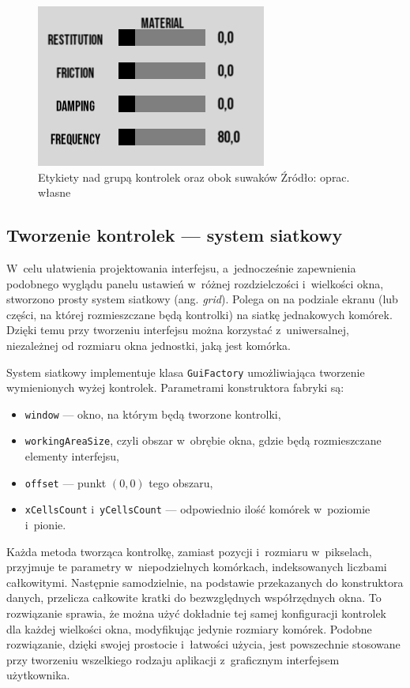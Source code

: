 \begin{figure}[h]
	\centering
	\includegraphics[width=0.3\linewidth]{images/labels}
	\caption[Etykiety nad grupą kontrolek oraz obok suwaków]{Etykiety nad grupą kontrolek oraz obok suwaków \newline Źródło: oprac. własne}
	\label{fig:label}
\end{figure}


\subsection{Tworzenie kontrolek --- system  siatkowy}
W~celu ułatwienia projektowania interfejsu, a~jednocześnie zapewnienia podobnego wyglądu panelu ustawień w~różnej rozdzielczości i~wielkości okna, stworzono prosty system siatkowy (ang. \textit{grid}). Polega on na podziale ekranu (lub części, na której rozmieszczane będą kontrolki) na siatkę jednakowych komórek. Dzięki temu przy tworzeniu interfejsu można korzystać z~uniwersalnej, niezależnej od rozmiaru okna jednostki, jaką jest komórka. 

System siatkowy implementuje klasa \verb|GuiFactory| umożliwiająca tworzenie wymienionych wyżej kontrolek. Parametrami konstruktora fabryki są:
\begin{itemize}
	\item \verb|window| --- okno, na którym będą tworzone kontrolki,
	\item \verb|workingAreaSize|, czyli obszar w~obrębie okna, gdzie będą rozmieszczane elementy interfejsu,
	\item \verb|offset| --- punkt $(0,0)$ tego obszaru,
	\item \verb|xCellsCount| i~\verb|yCellsCount| --- odpowiednio ilość komórek w~poziomie i~pionie.
\end{itemize}

Każda metoda tworząca kontrolkę, zamiast pozycji i~rozmiaru w~pikselach, przyjmuje te parametry w~niepodzielnych komórkach, indeksowanych liczbami całkowitymi. Następnie samodzielnie, na podstawie przekazanych do konstruktora danych, przelicza całkowite kratki do bezwzględnych współrzędnych okna. To rozwiązanie sprawia, że można użyć dokładnie tej samej konfiguracji kontrolek dla każdej wielkości okna, modyfikując jedynie rozmiary komórek. Podobne rozwiązanie, dzięki swojej prostocie i~łatwości użycia, jest powszechnie stosowane przy tworzeniu wszelkiego rodzaju aplikacji z~graficznym interfejsem użytkownika.

